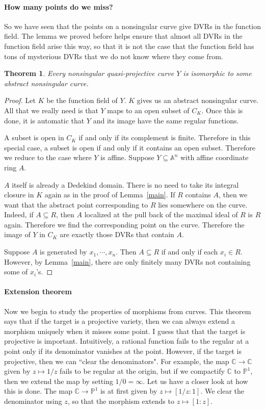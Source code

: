 \documentclass[12pt]{article}
\theoremstyle{plain}
\newtheorem{theorem}[equation]{Theorem}
\theoremstyle{definition}
\theoremstyle{named}
\newcommand{\IA}{\mathbb{A}}
\newcommand{\IP}{\mathbb{P}}
\newcommand{\<}{\langle}
\renewcommand{\>}{\rangle}
\newcommand{\IC}{\mathbb{C}}
\begin{document}
\paragraph{How many points do we miss?}
So we have seen that the points on a nonsingular curve give DVRs in the function field. The lemma we proved before helps ensure that almost all DVRs in the function field arise this way, so that it is not the case that the function field has tons of mysterious DVRs that we do not know where they come from. 

\begin{theorem}
Every nonsingular quasi-projective curve $Y$ is isomorphic to some abstract nonsingular curve. 
\end{theorem}
\begin{proof}
Let $K$ be the function field of $Y$. $K$ gives us an abstract nonsingular curve. All that we really need is that $Y$ maps to an open subset of $C_K$. Once this is done, it is automatic that $Y$ and its image have the same regular functions. 

A subset is open in $C_K$ if and only if its complement is finite. Therefore in this special case, a subset is open if and only if it contains an open subset. Therefore we reduce to the case where $Y$ is affine. Suppose $Y \subseteq \IA^n$ with affine coordinate ring $A$. 

$A$ itself is already a Dedekind domain. There is no need to take its integral closure in $K$ again as in the proof of Lemma~\ref{main}. If $R$ contains $A$, then we want that the abstract point corresponding to $R$ lies somewhere on the curve. Indeed, if $A \subseteq R$, then $A$ localized at the pull back of the maximal ideal of $R$ is $R$ again. Therefore we find the corresponding point on the curve. Therefore the image of $Y$ in $C_K$ are exactly those DVRs that contain $A$. 

Suppose $A$ is generated by $x_1, \cdots, x_n$. Then $A \subseteq R$ if and only if each $x_i \in R$. However, by Lemma~\ref{main}, there are only finitely many DVRs not containing some of $x_i$'s. 
\end{proof}

\paragraph{Extension theorem}
Now we begin to study the properties of morphisms from curves. This theorem says that if the target is a projective variety, then we can always extend a morphism uniquely when it misses some point. I guess that that the target is projective is important. Intuitively, a rational function fails to the regular at a point only if its denominator vanishes at the point. However, if the target is projective, then we can ``clear the denominators". For example, the map $\IC \to \IC$ given by $z \mapsto 1/z$ fails to be regular at the origin, but if we compactify $\IC$ to $\IP^1$, then we extend the map by setting $1/0 = \infty$. Let us have a closer look at how this is done. The map $\IC \to \IP^1$ is at first given by $z \mapsto [1/z : 1]$. We clear the denominator using $z$, so that the morphism extends to $z \mapsto [1 : z]$. 
\end{document}
